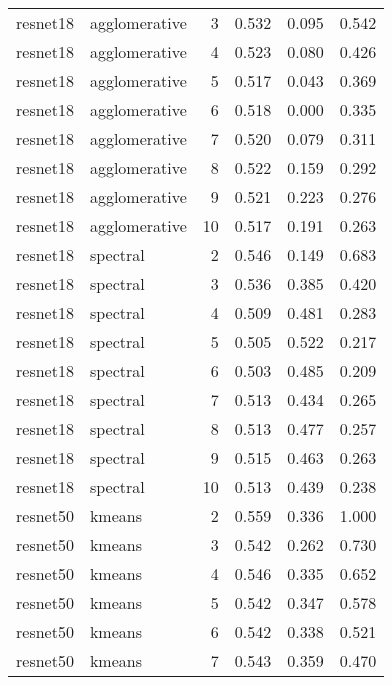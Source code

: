 \begin{longtable}{llrrrr}
   resnet18 & agglomerative &  3 &            0.532 &   0.095 &    0.542 \\
   resnet18 & agglomerative &  4 &            0.523 &   0.080 &    0.426 \\
   resnet18 & agglomerative &  5 &            0.517 &   0.043 &    0.369 \\
   resnet18 & agglomerative &  6 &            0.518 &   0.000 &    0.335 \\
   resnet18 & agglomerative &  7 &            0.520 &   0.079 &    0.311 \\
   resnet18 & agglomerative &  8 &            0.522 &   0.159 &    0.292 \\
   resnet18 & agglomerative &  9 &            0.521 &   0.223 &    0.276 \\
   resnet18 & agglomerative & 10 &            0.517 &   0.191 &    0.263 \\
   resnet18 &      spectral &  2 &            0.546 &   0.149 &    0.683 \\
   resnet18 &      spectral &  3 &            0.536 &   0.385 &    0.420 \\
   resnet18 &      spectral &  4 &            0.509 &   0.481 &    0.283 \\
   resnet18 &      spectral &  5 &            0.505 &   0.522 &    0.217 \\
   resnet18 &      spectral &  6 &            0.503 &   0.485 &    0.209 \\
   resnet18 &      spectral &  7 &            0.513 &   0.434 &    0.265 \\
   resnet18 &      spectral &  8 &            0.513 &   0.477 &    0.257 \\
   resnet18 &      spectral &  9 &            0.515 &   0.463 &    0.263 \\
   resnet18 &      spectral & 10 &            0.513 &   0.439 &    0.238 \\
   resnet50 &        kmeans &  2 &            0.559 &   0.336 &    1.000 \\
   resnet50 &        kmeans &  3 &            0.542 &   0.262 &    0.730 \\
   resnet50 &        kmeans &  4 &            0.546 &   0.335 &    0.652 \\
   resnet50 &        kmeans &  5 &            0.542 &   0.347 &    0.578 \\
   resnet50 &        kmeans &  6 &            0.542 &   0.338 &    0.521 \\
   resnet50 &        kmeans &  7 &            0.543 &   0.359 &    0.470 \\

\end{longtable}
